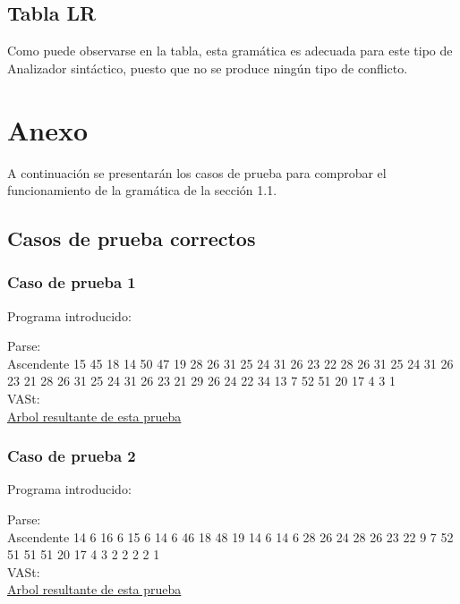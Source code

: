 \documentclass[12pt, a4paper, titlepage]{article}
\begin{document}
\subsection{Tabla LR}
\label{subsec:LRtable}



Como puede observarse en la tabla, esta gramática es adecuada para este tipo de Analizador sintáctico, puesto que no se produce ningún tipo de conflicto.

\section{Anexo}
\label{sec:anex}
A continuación se presentarán los casos de prueba para comprobar el funcionamiento de la gramática de la sección 1.1.

\subsection{Casos de prueba correctos}
\label{subsec:casosCorrectos}
\subsubsection{Caso de prueba 1}
\label{subsec:correcto1}
\begin{center}
  Programa introducido:
  
  Parse: \\
  Ascendente 15 45 18 14 50 47 19 28 26 31 25 24 31 26 23 22 28 26 31 25 24 31 26 23 21 28 26 31 25 24 31 26 23 21 29 26 24 22 34 13 7 52 51 20 17 4 3 1 \\
  VASt: \\
  \href{run:./Arbol1.pdf}{Arbol resultante de esta prueba} 
\end{center}

\subsubsection{Caso de prueba 2}
\label{subsec:correcto2}
\begin{center}
  Programa introducido:
  
  Parse: \\
  Ascendente 14 6 16 6 15 6 14 6 46 18 48 19 14 6 14 6 28 26 24 28 26 23 22 9 7 52 51 51 51 20 17 4 3 2 2 2 2 1 \\
  VASt: \\
  \href{run:./Arbol2.pdf}{Arbol resultante de esta prueba} 
\end{center}
\end{document}
